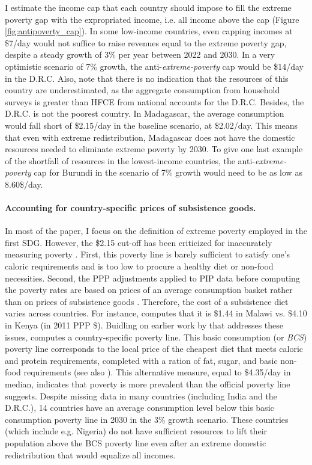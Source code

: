 \documentclass[12pt,english]{article}
\begin{document}
I estimate the income cap that each country should impose to fill the extreme poverty gap with the expropriated income, i.e. all income above the cap (Figure \ref{fig:antipoverty_cap}). 
In some low-income countries, even capping incomes at \$7/day would not suffice to raise revenues equal to the extreme poverty gap, despite a steady growth of 3\% per year between 2022 and 2030. 
In a very optimistic scenario of 7\% growth, the anti-\textit{extreme-poverty} cap would be \$14/day in the D.R.C. Also, note that there is no indication that the resources of this country are underestimated, as the aggregate consumption from household surveys is greater than HFCE %
from national accounts for the D.R.C. 
Besides, the D.R.C. is not the poorest country. 
In Madagascar, the average consumption would fall short of \$2.15/day in the baseline scenario, at \$2.02/day. This means that even with extreme redistribution, Madagascar does not have the domestic resources needed to eliminate extreme poverty by 2030. 
To give one last example of the shortfall of resources in the lowest-income countries, the anti-\textit{extreme-poverty} cap for Burundi in the scenario of 7\% growth would need to be as low as 8.60\$/day. 

\paragraph{Accounting for country-specific prices of subsistence goods.}
In most of the paper, I focus on the definition of extreme poverty employed in the first SDG. However, the \$2.15 cut-off has been criticized for inaccurately measuring poverty \citep{woodward_redefining_2010,deaton_price_2010,deaton_purchasing_2011}. %
First, this poverty line %
is barely sufficient to satisfy one's caloric requirements and is too low to procure a healthy diet or non-food necessities. 
Second, the PPP adjustments applied to PIP data before computing the poverty rates are based on prices of an average consumption basket rather than on prices of subsistence goods \citep{sullivan_capitalist_2023}. Therefore, the cost of a subsistence diet varies across countries. For instance, \cite{moatsos_global_2016} computes that it is \$1.44 in Malawi vs. \$4.10 in Kenya (in 2011 PPP \$). Buidling on earlier work by \cite{allen_absolute_2017} that addresses these issues, \cite{moatsos_global_2016} computes a country-specific poverty line. This basic consumption (or \textit{BCS}) poverty line corresponds to the local price of the cheapest diet that meets caloric and protein requirements, completed with a ration of fat, sugar, and basic non-food requirements (see also \citealp{moatsos_global_2021}). This alternative measure, equal to \$4.35/day in median, indicates that poverty %
is more prevalent than the official poverty line suggests. Despite missing data in many countries (including India and the D.R.C.), 14 countries have an average consumption level below this basic consumption poverty line in 2030 in the 3\% growth scenario. These countries (which include e.g. Nigeria) do not have sufficient resources to lift their population above the BCS poverty line even after an extreme domestic redistribution that would equalize all incomes. 
\end{document}
